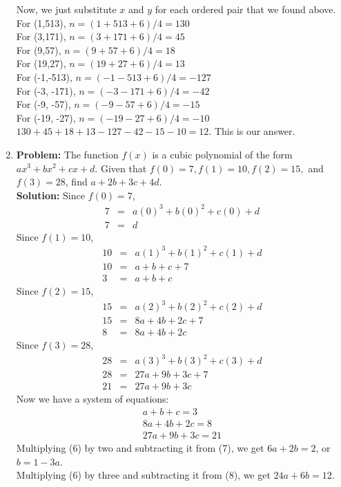 \documentclass{article}
\begin{document}
\begin{enumerate}
Now, we just substitute $x$ and $y$ for each ordered pair that we found above. \\

For (1,513), $n = (1+513+6)/4 = 130$ \\
For (3,171), $n = (3+171+6)/4 = 45$ \\
For (9,57), $n = (9+57+6)/4 = 18$ \\
For (19,27), $n = (19+27+6)/4 = 13$ \\
For (-1,-513), $n = (-1-513+6)/4 = -127$ \\
For (-3, -171), $n = (-3-171+6)/4 = -42$ \\
For (-9, -57), $n = (-9-57 +6)/4 = -15$ \\
For (-19, -27), $n = (-19-27+6)/4 = -10$ \\

$130 + 45 + 18 + 13 - 127 - 42 - 15 - 10 = 12$.  This is our answer.


\item \textbf{Problem:} The function $f(x)$ is a cubic polynomial of the form $ax^3 + bx^2 + cx + d$.  Given that $f(0) = 7, f(1) = 10, f(2) = 15,$ and $f(3) = 28$, find $a + 2b + 3c + 4d$. \\

\textbf{Solution:} Since $f(0) = 7$,
\begin{eqnarray*}
7 &=& a(0)^3 + b(0)^2 + c(0) + d \\
7 &=& d
\end{eqnarray*}
Since $f(1) = 10$,
\begin{eqnarray*}
10 &=& a(1)^3 + b(1)^2 + c(1) + d \\
10 &=& a + b + c + 7 \\
3 &=& a + b + c
\end{eqnarray*}
Since $f(2) = 15$,
\begin{eqnarray*}
15 &=& a(2)^3 + b(2)^2 + c(2) + d \\
15 &=& 8a + 4b + 2c + 7 \\
8 &=& 8a + 4b + 2c
\end{eqnarray*}
Since $f(3) = 28$,
\begin{eqnarray*}
28 &=& a(3)^3 + b(3)^2 + c(3) + d \\
28 &=& 27a + 9b + 3c + 7 \\
21 &=& 27a + 9b + 3c
\end{eqnarray*}
Now we have a system of equations:
\begin{eqnarray}
a + b + c = 3 \\
8a + 4b + 2c = 8 \\
27a + 9b + 3c = 21
\end{eqnarray}
Multiplying (6) by two and subtracting it from (7), we get $6a + 2b = 2$, or $b = 1 - 3a$. \\
Multiplying (6) by three and subtracting it from (8), we get $24a + 6b = 12$. \\


\end{enumerate}
\end{document}
